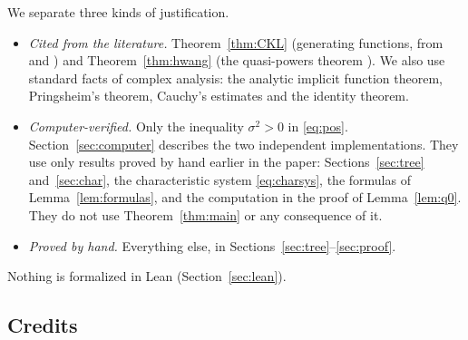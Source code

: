 \documentclass[11pt]{amsart}
\theoremstyle{definition}
\theoremstyle{remark}
\numberwithin{equation}{section}
\begin{document}
We separate three kinds of justification.
\begin{itemize}
\item \emph{Cited from the literature.} Theorem~\ref{thm:CKL} (generating functions, from \cite{CKL} and \cite{CK}) and Theorem~\ref{thm:hwang} (the quasi-powers theorem \cite{Hw}). We also use standard facts of complex analysis: the analytic implicit function theorem, Pringsheim's theorem, Cauchy's estimates and the identity theorem.
\item \emph{Computer-verified.} Only the inequality \(\sigma^2>0\) in \eqref{eq:pos}. Section~\ref{sec:computer} describes the two independent implementations. They use only results proved by hand earlier in the paper: Sections~\ref{sec:tree} and~\ref{sec:char}, the characteristic system \eqref{eq:charsys}, the formulas of Lemma~\ref{lem:formulas}, and the computation in the proof of Lemma~\ref{lem:q0}. They do not use Theorem~\ref{thm:main} or any consequence of it.
\item \emph{Proved by hand.} Everything else, in Sections~\ref{sec:tree}--\ref{sec:proof}.
\end{itemize}
Nothing is formalized in Lean (Section~\ref{sec:lean}).

\subsection{Credits}
\end{document}
